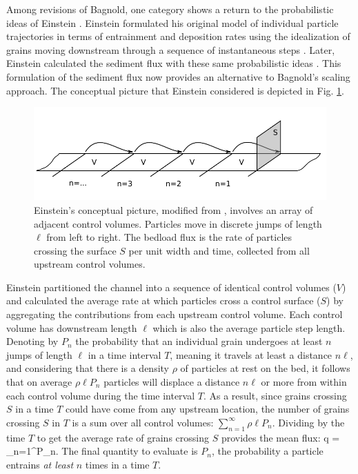 Among revisions of Bagnold, one category shows a return to the probabilistic ideas of Einstein \citep{Parker2003,Ancey2006}. Einstein formulated his original model of individual particle trajectories in terms of entrainment and deposition rates using the idealization of grains moving downstream through a sequence of instantaneous steps \citep{Einstein1937}.
Later, Einstein calculated the sediment flux with these same probabilistic ideas \citep{Einstein1942, Einstein1950}. This formulation of the sediment flux now provides an alternative to Bagnold's scaling approach.
The conceptual picture that Einstein considered is depicted in Fig. \ref{fig:einsteinFluxConcept}.
 \begin{figure}[!htbp]
	\includegraphics[width=\linewidth,keepaspectratio]{./figures/ch1/yalinDrawing.pdf}
	\caption{Einstein’s conceptual picture, modified from \citet{Yalin1972}, involves an array of adjacent control volumes. Particles move in discrete jumps of length $\ell$ from
left to right. The bedload flux is the rate of particles crossing
the surface $S$ per unit width and time, collected from all upstream control volumes.}
	\label{fig:einsteinFluxConcept}
\end{figure}

Einstein partitioned the channel into a sequence of identical control volumes ($V$) and calculated the average rate at which particles cross a control surface ($S$) by aggregating the contributions from each upstream control volume.
Each control volume has downstream length $\ell$ which is also the average particle step length.
Denoting by $P_n$ the probability that an individual grain undergoes at least $n$ jumps of length $\ell$ in a time interval $T$, meaning it travels at least a distance $n \ell$, and considering that there is a density $\rho$ of particles at rest on the bed, it follows that on average $\rho \ell P_n$ particles will displace a distance $n \ell$ or more from within each control volume during the time interval $T$. 
As a result, since grains crossing $S$ in a time $T$ could have come from any upstream location, the number of grains crossing $S$ in $T$ is a sum over all control volumes: $\sum_{n=1}^\infty \rho \ell P_n$.
Dividing by the time $T$ to get the average rate of grains crossing $S$ provides the mean flux:
\be q =  \sum_{n=1}^\infty P_n. \label{eq:einflux} \ee
The final quantity to evaluate is $P_n$, the probability a particle entrains \textit{at least} $n$ times in a time $T$.


